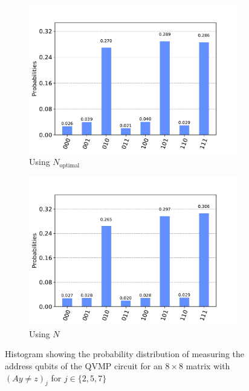 \documentclass[11pt]{article}
\theoremstyle{definition}
\theoremstyle{remark}
\begin{document}
\begin{figure}[h!]
  \centering
  \begin{subfigure}{0.48\textwidth}
    \centering
    \includegraphics[width=\textwidth]{../../results/figures/qvmp_functionality_found_known.pdf}
    \caption{Using $N_{\text{optimal}}$}
  \end{subfigure}
  \begin{subfigure}{0.48\textwidth}
    \centering
    \includegraphics[width=\textwidth]{../../results/figures/qvmp_functionality_found_unknown.pdf}
    \caption{Using $N$}
  \end{subfigure}
  \caption{Histogram showing the probability distribution of measuring the
  address qubits of the QVMP circuit for an $8 \times 8$ matrix with $(Ay \neq
  z)_j$ for $j \in \{2, 5, 7\}$}
  \label{fig:qvmp_functionality_found}
\end{figure}
\end{document}
